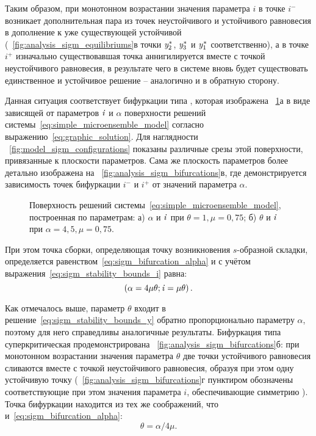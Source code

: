 Таким образом, при монотонном возрастании значения параметра $i$ в точке $i^{-}$ возникает дополнительная пара из точек неустойчивого и устойчивого равновесия в дополнение к уже существующей устойчивой (\onfigure~\ref{fig:analysis_sigm_equilibriums}в точки $\mathit{y}^{*}_{2}$, $\mathit{y}^{*}_{3}$ и $\mathit{y}^{*}_{1}$ соответственно), а в точке $i^{+}$ изначально существовавшая точка аннигилируется вместе с точкой неустойчивого равновесия, в результате чего в системе вновь будет существовать единственное и устойчивое решение -- аналогично и в обратную сторону.

Данная ситуация соответствует бифуркации типа , которая изображена \onfigure~\ref{fig:analysis_sigm_solution_surface}а в виде зависящей от параметров $\mathit{i}$ и $\alpha$ поверхности решений системы~\eqref{eq:simple_microensemble_model} согласно выражению~\eqref{eq:graphic_solution}. Для наглядности \onfigure~\ref{fig:model_sigm_configurations} показаны различные срезы этой поверхности, привязанные к плоскости параметров. Сама же плоскость параметров более детально изображена на \onfigure~\ref{fig:analysis_sigm_bifurcations}в, где демонстрируется зависимость точек бифуркации $i^{-}$ и $i^{+}$ от значений параметра $\alpha$. 
\begin{figure}[ht]
    \caption{Поверхность решений системы~\eqref{eq:simple_microensemble_model}, построенная по параметрам: а) $\alpha$ и $\mathit{i}$ при $\theta = 1, \mu = 0,75$; б) $\theta$ и $\mathit{i}$ при $\alpha = 4,5, \mu = 0,75$.}
    \label{fig:analysis_sigm_solution_surface}
\end{figure}
При этом \socalled точка сборки, определяющая точку возникновения $s$-образной складки, определяется равенством~\eqref{eq:sigm_bifurcation_alpha} и с учётом выражения~\eqref{eq:sigm_stability_bounds_i} равна:
\begin{equation}
    \nonumber
    \left(\alpha = 4 \mu \theta; \mathit{i} = \mu \theta\right).
\end{equation}

Как отмечалось выше, параметр $\theta$ входит в решение~\eqref{eq:sigm_stability_bounds_y} обратно пропорционально параметру $\alpha$, поэтому для него справедливы аналогичные результаты. Бифуркация типа суперкритическая  продемонстрирована \onfigure~\ref{fig:analysis_sigm_bifurcations}б: при монотонном возрастании значения параметра $\theta$ две точки устойчивого равновесия сливаются вместе с точкой неустойчивого равновесия, образуя при этом одну устойчивую точку (\onfigure~\ref{fig:analysis_sigm_bifurcations}г пунктиром обозначены соответствующие при этом значения параметра $i$, обеспечивающие симметрию ). Точка бифуркации находится из тех же соображений, что и~\eqref{eq:sigm_bifurcation_alpha}:
\begin{equation}
    \label{eq:sigm_bifurcation_theta}
    \theta =  \alpha / 4 \mu.
\end{equation}

